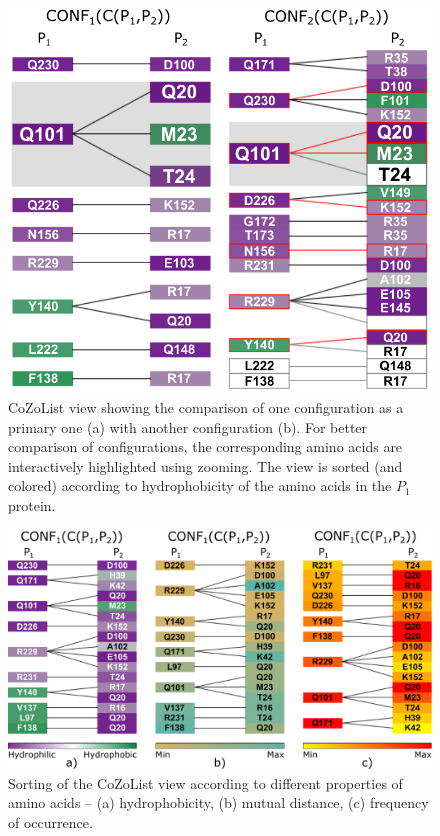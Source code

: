\documentclass{bmcart}
\begin{document}
\begin{backmatter}
\begin{figure}[h!]
    \centering
  \includegraphics[width=\columnwidth]{images/figure7.pdf}
    \caption{ CoZoList view showing the comparison of one configuration as a primary one (a) with another configuration (b). For better comparison of configurations, the corresponding amino acids are interactively highlighted using zooming. The view is sorted (and colored) according to hydrophobicity of the amino acids in the $P_1$ protein.}
  \label{fig:list}
\end{figure}


\begin{figure}[h!]
    \centering
  \includegraphics[width=\columnwidth]{images/figure8.pdf}
    \caption{ Sorting of the CoZoList view according to different properties of amino acids -- (a) hydrophobicity, (b) mutual distance, (c) frequency of occurrence.}
  \label{fig:sorting}
\end{figure}


\end{backmatter}
\end{document}
